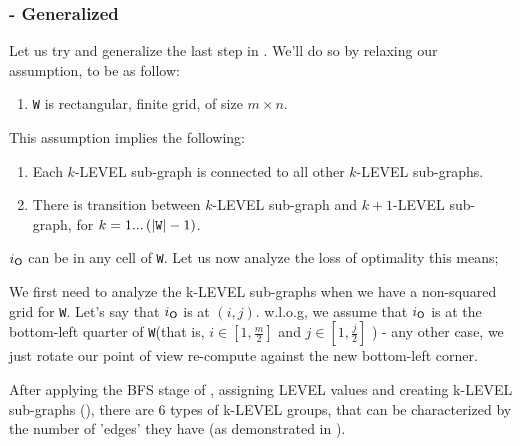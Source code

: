 \documentclass[a4paper,11pt]{article}
\theoremstyle{definition}
\newcommand{\opp}{{{\sf O}}\xspace}
\newcommand{\io}{{\ensuremath{i_{\opp}}}\xspace}
\newcommand{\w}{{{\texttt W}}\xspace}
\newcommand{\ltr}{{{\sf{LTR}}}\xspace}
\DeclarePairedDelimiter\abs{\lvert}{\rvert}%
\begin{document}
\subsubsection{\ltr - Generalized}
Let us try and generalize the last step in \ltr. We'll do so by relaxing our assumption, to be as follow:
\begin{enumerate}
    \item \w is rectangular, finite grid, of size $m\times n$.
\end{enumerate}
This assumption implies the following:
\begin{enumerate}
    \item Each $k$-LEVEL sub-graph is connected to all other $k$-LEVEL sub-graphs.
    \item There is transition between $k$-LEVEL sub-graph and $k+1$-LEVEL sub-graph, for $k=1...\left(\abs*{\w}-1\right)$.
\end{enumerate}

\io can be in any cell of \w. Let us now analyze the loss of optimality this means;

We first need to analyze the k-LEVEL sub-graphs when we have a non-squared grid for \w. Let's say that \io is at $\left( i,j \right)$. w.l.o.g, we assume that \io is at the bottom-left quarter of \w (that is, $i\in\left[1,\frac{m}{2}\right]$ and $j\in\left[1,\frac{j}{2}\right]$ ) - any other case, we just rotate our point of view re-compute against the new bottom-left corner.

After applying the BFS stage of \ltr, assigning LEVEL values and creating k-LEVEL sub-graphs (), there are 6 types of k-LEVEL groups, that can be characterized by the number of 'edges' they have (as demonstrated in ).
\end{document}
